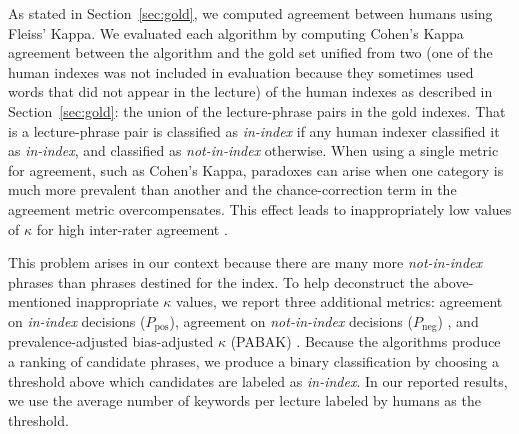 
As stated in Section~\ref{sec:gold}, we computed agreement between
humans using Fleiss' Kappa. We evaluated each algorithm by computing
Cohen's Kappa agreement between the algorithm and the gold set
unified from two (one of the human indexes was not included in evaluation
because they sometimes used words that did not appear in the lecture) of the human indexes as described in
Section~\ref{sec:gold}: the union of the lecture-phrase pairs in the
gold indexes. That is a lecture-phrase pair is classified as {\em
  in-index} if any human indexer classified it as {\em in-index}, and
classified as {\em not-in-index} otherwise. When using a single metric
for agreement, such as Cohen's Kappa, paradoxes can arise when one
category is much more prevalent than another and the chance-correction
term in the agreement metric overcompensates. This effect leads to
inappropriately low values of $\kappa$ for high inter-rater agreement
\cite{feinstein1990high}.

This problem arises in our context because there are many more {\em not-in-index} phrases than
phrases destined for the index. To help deconstruct the above-mentioned
inappropriate $\kappa$ values, we report three additional metrics:
agreement on {\em in-index} decisions ($P_{\text{pos}}$), agreement on
{\em not-in-index} decisions ($P_{\text{neg}}$)
\cite{cicchetti1990high}, and prevalence-adjusted bias-adjusted
$\kappa$ (PABAK) \cite{byrt1993bias}. Because the algorithms produce a
ranking of candidate phrases, we produce a binary classification by
choosing a threshold above which candidates are labeled as {\em
  in-index}. In our reported results, we use the average number of
keywords per lecture labeled by humans as the threshold.

